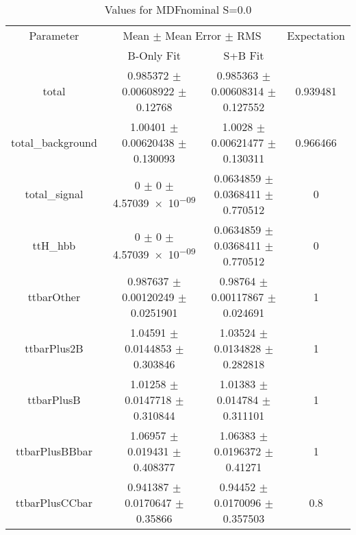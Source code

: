 \begin{table}
\centering
\caption{Values for MDFnominal S=0.0}
\begin{tabular}{cccc}
\toprule
Parameter & \multicolumn{2}{c}{Mean $\pm$ Mean Error $\pm$ RMS} & Expectation\\
 & B-Only Fit & S+B Fit & \\
\midrule
total & \num{0.985372} $\pm$ \num{0.00608922} $\pm$ \num{0.12768} & \num{0.985363} $\pm$ \num{0.00608314} $\pm$ \num{0.127552} & \num{0.939481}\\
total\_background & \num{1.00401} $\pm$ \num{0.00620438} $\pm$ \num{0.130093} & \num{1.0028} $\pm$ \num{0.00621477} $\pm$ \num{0.130311} & \num{0.966466}\\
total\_signal & \num{0} $\pm$ \num{0} $\pm$ \num{4.57039e-09} & \num{0.0634859} $\pm$ \num{0.0368411} $\pm$ \num{0.770512} & \num{0}\\
ttH\_hbb & \num{0} $\pm$ \num{0} $\pm$ \num{4.57039e-09} & \num{0.0634859} $\pm$ \num{0.0368411} $\pm$ \num{0.770512} & \num{0}\\
ttbarOther & \num{0.987637} $\pm$ \num{0.00120249} $\pm$ \num{0.0251901} & \num{0.98764} $\pm$ \num{0.00117867} $\pm$ \num{0.024691} & \num{1}\\
ttbarPlus2B & \num{1.04591} $\pm$ \num{0.0144853} $\pm$ \num{0.303846} & \num{1.03524} $\pm$ \num{0.0134828} $\pm$ \num{0.282818} & \num{1}\\
ttbarPlusB & \num{1.01258} $\pm$ \num{0.0147718} $\pm$ \num{0.310844} & \num{1.01383} $\pm$ \num{0.014784} $\pm$ \num{0.311101} & \num{1}\\
ttbarPlusBBbar & \num{1.06957} $\pm$ \num{0.019431} $\pm$ \num{0.408377} & \num{1.06383} $\pm$ \num{0.0196372} $\pm$ \num{0.41271} & \num{1}\\
ttbarPlusCCbar & \num{0.941387} $\pm$ \num{0.0170647} $\pm$ \num{0.35866} & \num{0.94452} $\pm$ \num{0.0170096} $\pm$ \num{0.357503} & \num{0.8}\\
\bottomrule
\end{tabular}
\end{table}